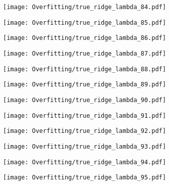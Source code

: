 \documentclass[xcolor=pdftex,dvipsnames,table]{beamer}
\begin{document}
\frame
{
	\begin{center}
		\texttt{[image: Overfitting/true\_ridge\_lambda\_84.pdf]}
	\end{center}
}

\frame
{
	\begin{center}
		\texttt{[image: Overfitting/true\_ridge\_lambda\_85.pdf]}
	\end{center}
}

\frame
{
	\begin{center}
		\texttt{[image: Overfitting/true\_ridge\_lambda\_86.pdf]}
	\end{center}
}

\frame
{
	\begin{center}
		\texttt{[image: Overfitting/true\_ridge\_lambda\_87.pdf]}
	\end{center}
}

\frame
{
	\begin{center}
		\texttt{[image: Overfitting/true\_ridge\_lambda\_88.pdf]}
	\end{center}
}

\frame
{
	\begin{center}
		\texttt{[image: Overfitting/true\_ridge\_lambda\_89.pdf]}
	\end{center}
}

\frame
{
	\begin{center}
		\texttt{[image: Overfitting/true\_ridge\_lambda\_90.pdf]}
	\end{center}
}

\frame
{
	\begin{center}
		\texttt{[image: Overfitting/true\_ridge\_lambda\_91.pdf]}
	\end{center}
}

\frame
{
	\begin{center}
		\texttt{[image: Overfitting/true\_ridge\_lambda\_92.pdf]}
	\end{center}
}

\frame
{
	\begin{center}
		\texttt{[image: Overfitting/true\_ridge\_lambda\_93.pdf]}
	\end{center}
}

\frame
{
	\begin{center}
		\texttt{[image: Overfitting/true\_ridge\_lambda\_94.pdf]}
	\end{center}
}

\frame
{
	\begin{center}
		\texttt{[image: Overfitting/true\_ridge\_lambda\_95.pdf]}
	\end{center}
}
\end{document}
